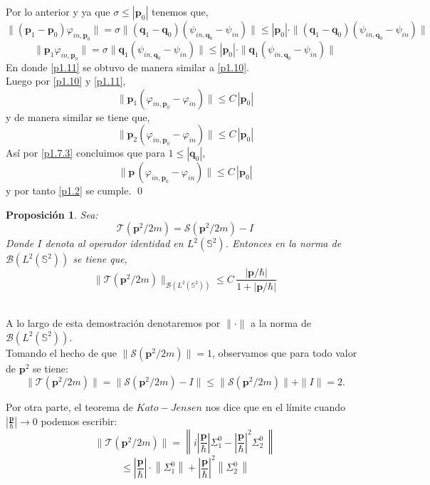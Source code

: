 \documentclass[12pt]{book}
\numberwithin{equation}{chapter}
\newtheorem{proposition}[theorem]{Proposici\'on}
\def\v{\mathbf}
\def\n{\noindent}
\def\S{\mathcal{S}}
\def\T{\mathcal{T}}
\def\B{\mathcal{B}}
\def\vp{\varphi}
\def\P{\mathbf{p}}
\begin{document}
Por lo anterior y ya que $\sigma \leq |\P_{0}|$ tenemos que,
\begin{equation}\label{p1.10}
\| (\P_{1}-\P_{0}) \vp_{in,\P_{0}}  \|=\sigma \| (\v{q}_{1}-\v{q}_{0}) (\psi_{in,\v{q}_{0}}-\psi_{in}) \| \leq |\P_{0}|\cdot \| (\v{q}_{1}-\v{q}_{0}) (\psi_{in,\v{q}_{0}}-\psi_{in}) \|
\end{equation}
\begin{equation}\label{p1.11}
\| \P_{1} \vp_{in,\P_{0}}  \|=\sigma \| \v{q}_{1} (\psi_{in,\v{q}_{0}}-\psi_{in}) \| \leq |\P_{0}|\cdot \| \v{q}_{1} (\psi_{in,\v{q}_{0}}-\psi_{in}) \|
\end{equation}
En donde \eqref{p1.11} se obtuvo de manera similar a \eqref{p1.10}.\\
Luego por \eqref{p1.10} y \eqref{p1.11},
$$ \| \P_{1} ( \vp_{in,\P_{0}} - \vp_{in} ) \| \leq C\, |\P_{0}| $$
y de manera similar se tiene que,
$$ \| \P_{2} ( \vp_{in,\P_{0}} - \vp_{in} ) \| \leq C\, |\P_{0}| $$
As\'i por \eqref{p1.7.3} concluimos que para $1 \leq |\v{q}_{0}|$,
$$ \| \P\, (\vp_{in,\P_{0}}-\vp_{in}) \| \leq C\, |\P_{0}| $$
y por tanto \eqref{p1.2} se cumple. \qed

\begin{proposition}
\label{p2}
Sea:
\begin{equation}\label{tau}
\T ( \P^{2}/2m )= \S (\P^{2}/2m) - I
\end{equation}
Donde $I$ denota al operador identidad en $L^{2}(\mathbb{S}^{2})$. Entonces en la norma de $ \B(L^{2}(\mathbb{S}^{2})) $ se tiene que,
\begin{equation}\label{taucot1}
\| \T(\P^{2}/2m) \|_{\B(L^{2}(\mathbb{S}^{2}))} \leq C\, \frac{ |\P/\hbar| }{1+|\P/\hbar|}
\end{equation}

\end{proposition}
\n {\bf Demostraci\'on}\\
A lo largo de esta demostraci\'on denotaremos por $\| \cdot \|$ a la norma de $\B(L^{2}(\mathbb{S}^{2}))$.\\
Tomando el hecho de que $\| \S(\P^{2}/2m) \|= 1$, observamos que para todo valor de $\P^{2}$ se tiene:
\begin{equation}\label{p2.1}
\| \T(\P^{2}/2m) \|=\| \S(\P^{2}/2m)-I  \|\leq \|\S(\P^{2}/2m) \|+ \| I \|= 2 .
\end{equation}

\n Por otra parte, el teorema de $Kato-Jensen$ nos dice que en el l\'imite cuando $\left| \frac{\P}{\hbar} \right| \rightarrow 0 $ podemos escribir:
$$ \| \T ( \P^{2}/2m ) \|= \left\|  i \left| \frac{\P}{\hbar} \right| \Sigma_{1}^{0} - \left| \frac{\P}{\hbar} \right|^{2} \Sigma_{2}^{0}  \, \right\|$$
$$ \leq \left| \frac{\P}{\hbar} \right|\cdot \left\|  \Sigma_{1}^{0} \right\|+ \left| \frac{\P}{\hbar} \right|^{2} \left\|   \Sigma_{2}^{0}  \, \right\|  $$
\end{document}
